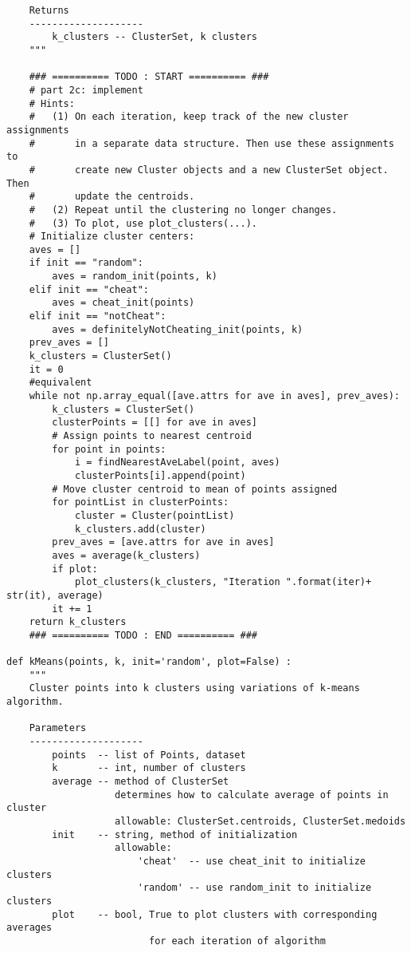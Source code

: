 \documentclass[11pt]{article}
\begin{document}
\begin{verbatim}
    Returns
    --------------------
        k_clusters -- ClusterSet, k clusters
    """
    
    ### ========== TODO : START ========== ###
    # part 2c: implement
    # Hints:
    #   (1) On each iteration, keep track of the new cluster assignments
    #       in a separate data structure. Then use these assignments to 
    #       create new Cluster objects and a new ClusterSet object. Then
    #       update the centroids.
    #   (2) Repeat until the clustering no longer changes.
    #   (3) To plot, use plot_clusters(...).
    # Initialize cluster centers:
    aves = []
    if init == "random":
        aves = random_init(points, k)
    elif init == "cheat":
        aves = cheat_init(points)
    elif init == "notCheat":
        aves = definitelyNotCheating_init(points, k)
    prev_aves = []
    k_clusters = ClusterSet()
    it = 0
    #equivalent
    while not np.array_equal([ave.attrs for ave in aves], prev_aves):
        k_clusters = ClusterSet()
        clusterPoints = [[] for ave in aves]
        # Assign points to nearest centroid
        for point in points:
            i = findNearestAveLabel(point, aves)
            clusterPoints[i].append(point)
        # Move cluster centroid to mean of points assigned
        for pointList in clusterPoints:
            cluster = Cluster(pointList)
            k_clusters.add(cluster)
        prev_aves = [ave.attrs for ave in aves]
        aves = average(k_clusters)
        if plot:
            plot_clusters(k_clusters, "Iteration ".format(iter)+ str(it), average)
        it += 1
    return k_clusters
    ### ========== TODO : END ========== ###

def kMeans(points, k, init='random', plot=False) :
    """
    Cluster points into k clusters using variations of k-means algorithm.
    
    Parameters
    --------------------
        points  -- list of Points, dataset
        k       -- int, number of clusters
        average -- method of ClusterSet
                   determines how to calculate average of points in cluster
                   allowable: ClusterSet.centroids, ClusterSet.medoids
        init    -- string, method of initialization
                   allowable: 
                       'cheat'  -- use cheat_init to initialize clusters
                       'random' -- use random_init to initialize clusters
        plot    -- bool, True to plot clusters with corresponding averages
                         for each iteration of algorithm
    

\end{verbatim}
\end{document}
